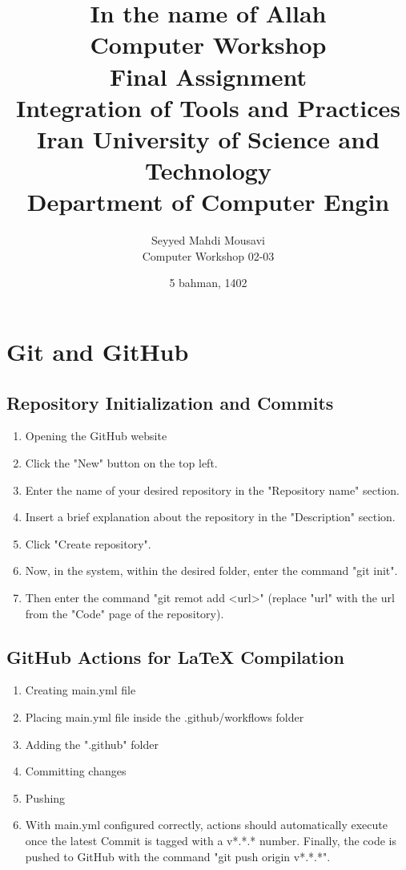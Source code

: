 \documentclass[12pt]{article}
\title{
    \textbf{\Huge In the name of Allah}\\
    \vspace{2in}
    \textbf{Computer Workshop}\\
    Final Assignment\\
    Integration of Tools and Practices\\
    \vspace{0.1in}
    \large Iran University of Science and Technology\\
    \large Department of Computer Engin
    \vspace{0.5in}
}
\author{
    \vspace{0.1in}
    Seyyed Mahdi Mousavi\\
    Computer Workshop 02-03\\
    \vspace{0.2in}
}
\date{5 bahman, 1402}
\begin{document}
\pagestyle{fancy}

\maketitle
\tableofcontents
\newpage

\maketitle

\section{Git and GitHub}
\subsection{Repository Initialization and Commits}
\begin{enumerate}
    \item Opening the GitHub website
    \item Click the "New" button on the top left.
    \item Enter the name of your desired repository in the "Repository name" section.
    \item Insert a brief explanation about the repository in the "Description" section.
    \item Click "Create repository".
    \item Now, in the system, within the desired folder, enter the command "git init".
    \item Then enter the command "git remot add <url>" (replace "url" with the url from the "Code" page of the repository).
\end{enumerate}

\subsection{GitHub Actions for LaTeX Compilation}
\begin{enumerate}
    \item Creating main.yml file
    \item Placing main.yml file inside the .github/workflows folder
    \item Adding the ".github" folder
    \item Committing changes
    \item Pushing
    \item With main.yml configured correctly, actions should automatically execute once the latest Commit is tagged with a v*.*.* number. Finally, the code is pushed to GitHub with the command "git push origin v*.*.*".
\end{enumerate}
\end{document}
